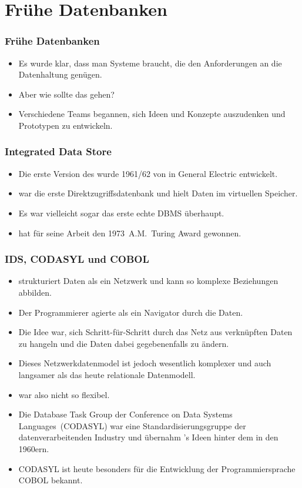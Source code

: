 \documentclass[aspectratio=169,mathserif,notheorems]{beamer}%
\begin{document}
\section{Frühe Datenbanken}%
%
\begin{frame}%
\frametitle{Frühe Datenbanken}%
\begin{itemize}%
\item Es wurde klar, dass man Systeme braucht, die den Anforderungen an die Datenhaltung genügen.%
\item<2-> Aber wie sollte das gehen?%
\item<3-> Verschiedene Teams begannen, sich Ideen und Konzepte auszudenken und Prototypen zu entwickeln.%
\end{itemize}%
\end{frame}%
%
\begin{frame}%
\frametitle{Integrated Data Store}%
\begin{itemize}%
\item Die erste Version des  wurde 1961/62 von \citeauthor{B2009TOOTIDSITFDAD} in General Electric entwickelt\cite{B2009TOOTIDSITFDAD,B1965SFRAP}.%
\item<2->  war die erste Direktzugriffsdatenbank und hielt Daten im virtuellen Speicher.%
\item<3-> Es war vielleicht sogar das erste echte DBMS überhaupt.%
\item<4->  hat für seine Arbeit den 1973~A.M.~Turing Award gewonnen\cite{H2016HCBITDAFOODW}.%
\end{itemize}%
\end{frame}%
%
\begin{frame}%
\frametitle{IDS, CODASYL und COBOL}%
\begin{itemize}%
\item {} strukturiert Daten als ein Netzwerk und kann so komplexe Beziehungen abbilden.%
\item<2-> Der Programmierer agierte als ein Navigator durch die Daten.%
\item<3-> Die Idee war, sich Schritt-für-Schritt durch das Netz aus verknüpften Daten zu hangeln und die Daten dabei gegebenenfalls zu ändern.%
\item<4-> Dieses Netzwerkdatenmodel ist jedoch wesentlich komplexer und auch langsamer als das heute relationale Datenmodell.%
\item<5->  war also nicht so flexibel.%
\item<6-> Die Database Task Group der Conference on Data Systems Languages~(CODASYL)\cite{TF1976CDBMS} war eine Standardisierungsgruppe der datenverarbeitenden Industry und übernahm \citeauthor{B2009TOOTIDSITFDAD}'s Ideen hinter dem  in den 1960ern.%
\item<7-> CODASYL ist heute besonders für die Entwicklung der Programmiersprache COBOL bekannt\cite{H2016HCBITDAFOODW}.%
\end{itemize}%
\end{frame}%
\end{document}
